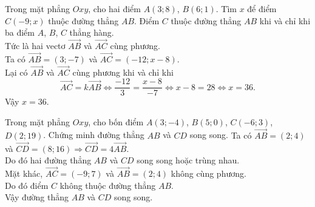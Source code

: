 \begin{vd}%
Trong mặt phẳng $Oxy$, cho hai điểm $A(3;8)$, $B(6;1)$. Tìm $x$ để điểm $C(-9;x)$ thuộc đường thẳng $AB$.
\loigiai
{Điểm $C$ thuộc đường thẳng $AB$ khi và chỉ khi ba điểm $A$, $B$, $C$ thẳng hàng.\\ 
Tức là hai vectơ $\vec{AB}$ và $\vec{AC}$ cùng phương.\\
Ta có $\vec{AB}=(3;-7)$ và $\vec{AC}=(-12;x-8)$.\\
Lại có $\vec{AB}$ và $\vec{AC}$ cùng phương khi và chỉ khi 
$$\vec{AC}=k\vec{AB} \Leftrightarrow \dfrac{-12}{3}=\dfrac{x-8}{-7} \Leftrightarrow x-8=28 \Leftrightarrow x=36.$$
Vậy $x=36$.}
\end{vd}
\begin{vd}%
Trong mặt phẳng $Oxy$, cho bốn điểm $A(3;-4)$, $B(5;0)$, $C(-6;3)$, $D(2;19)$. Chứng minh đường thẳng $AB$ và $CD$ song song.
\loigiai
{Ta có $\vec{AB}=(2;4)$ và $\vec{CD}=(8;16) \Rightarrow \vec{CD}=4\vec{AB}$.\\ 
Do đó hai đường thẳng $AB$ và $CD$ song song hoặc trùng nhau.\\
Mặt khác, $\vec{AC}=(-9;7)$ và $\vec{AB}=(2;4)$ không cùng phương.\\ 
Do đó điểm $C$ không thuộc đường thẳng $AB$.\\
Vậy đường thẳng $AB$ và $CD$ song song.}
\end{vd}
